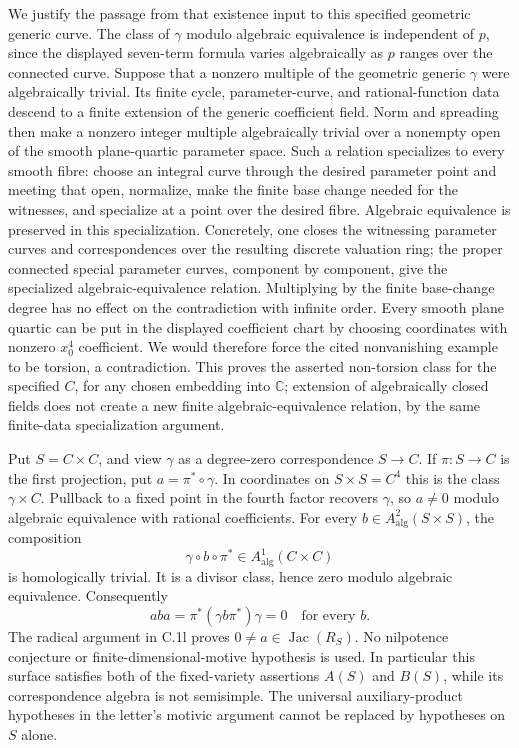 We justify the passage from that existence input to this
specified geometric generic curve. The class of $\gamma$
modulo algebraic equivalence is independent of $p$, since
the displayed seven-term formula varies algebraically as
$p$ ranges over the connected curve. Suppose that a nonzero
multiple of the geometric generic $\gamma$ were algebraically
trivial. Its finite cycle, parameter-curve, and rational-function
data descend to a finite extension of the generic coefficient
field. Norm and spreading then make a nonzero integer multiple
algebraically trivial over a nonempty open of the smooth
plane-quartic parameter space. Such a relation specializes to
every smooth fibre: choose an integral curve through the
desired parameter point and meeting that open, normalize,
make the finite base change needed for the witnesses, and
specialize at a point over the desired fibre. Algebraic
equivalence is preserved in this specialization. Concretely,
one closes the witnessing parameter curves and correspondences
over the resulting discrete valuation ring; the proper
connected special parameter curves, component by component,
give the specialized algebraic-equivalence relation. Multiplying
by the finite base-change degree has no effect on the
contradiction with infinite order. Every smooth plane quartic
can be put in the displayed coefficient chart by choosing
coordinates with nonzero $x_0^4$ coefficient. We would therefore
force the cited nonvanishing example to be torsion, a contradiction.
This proves the asserted non-torsion class for the specified
$C$, for any chosen embedding into $\mathbb C$; extension of
algebraically closed fields does not create a new finite
algebraic-equivalence relation, by the same finite-data
specialization argument.

Put $S=C\times C$, and view $\gamma$ as a degree-zero
correspondence $S\to C$. If $\pi:S\to C$ is the first
projection, put $a=\pi^*\circ\gamma$. In coordinates on
$S\times S=C^4$ this is the class $\gamma\times C$.
Pullback to a fixed point in the fourth factor recovers
$\gamma$, so $a\ne0$ modulo algebraic equivalence with
rational coefficients.
For every $b\in A^2_{\mathrm{alg}}(S\times S)$, the composition
\[
       \gamma\circ b\circ\pi^*
          \in A^1_{\mathrm{alg}}(C\times C)
\]
is homologically trivial. It is a divisor class, hence zero
modulo algebraic equivalence. Consequently
\[
 aba=\pi^*(\gamma b\pi^*)\gamma=0
                         \quad\text{for every }b.
\]
The radical argument in C.1l proves $0\ne a\in\operatorname{Jac}(R_S)$.
No nilpotence conjecture or finite-dimensional-motive hypothesis
is used. In particular this surface satisfies both of the
fixed-variety assertions $A(S)$ and $B(S)$, while its
correspondence algebra is not semisimple. The universal
auxiliary-product hypotheses in the letter's motivic argument
cannot be replaced by hypotheses on $S$ alone.

